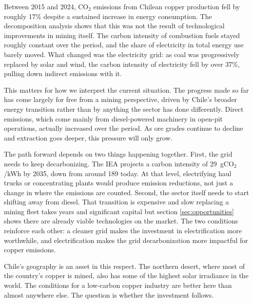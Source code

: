 Between 2015 and 2024, CO$_2$ emissions from Chilean copper production fell by roughly 17\% despite a sustained increase in energy consumption. The decomposition analysis shows that this was not the result of technological improvements in mining itself. The carbon intensity of combustion fuels stayed roughly constant over the period, and the share of electricity in total energy use barely moved. What changed was the electricity grid: as coal was progressively replaced by solar and wind, the carbon intensity of electricity fell by over 37\%, pulling down indirect emissions with it.

This matters for how we interpret the current situation. The progress made so far has come largely for free from a mining perspective, driven by Chile's broader energy transition rather than by anything the sector has done differently. Direct emissions, which come mainly from diesel-powered machinery in open-pit operations, actually increased over the period. As ore grades continue to decline and extraction goes deeper, this pressure will only grow.

The path forward depends on two things happening together. First, the grid needs to keep decarbonizing. The IEA projects a carbon intensity of 29~gCO$_2$/kWh by 2035, down from around 189 today. At that level, electrifying haul trucks or concentrating plants would produce emission reductions, not just a change in where the emissions are counted. Second, the sector itself needs to start shifting away from diesel. That transition is expensive and slow replacing a mining fleet takes years and significant capital but section \ref{sec:opportunities} shows there are already viable technologies on the market. The two conditions reinforce each other: a cleaner grid makes the investment in electrification more worthwhile, and electrification makes the grid decarbonization more impactful for copper emissions.

Chile's geography is an asset in this respect. The northern desert, where most of the country's copper is mined, also has some of the highest solar irradiance in the world. The conditions for a low-carbon copper industry are better here than almost anywhere else. The question is whether the investment follows.